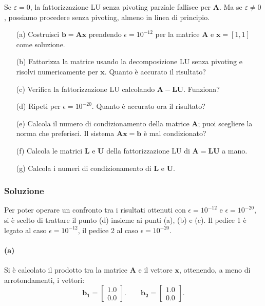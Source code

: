 \documentclass[letterpaper, 12pt]{article}
\numberwithin{equation}{section}    %
\begin{document}
Se $\varepsilon=0$, la fattorizzazione LU senza pivoting parziale fallisce per $\mathbf{A}$. Ma se 
$\varepsilon\neq 0$, 
possiamo procedere senza pivoting, almeno in linea di principio. \\
\begin{enumerate}[label=(\alph*)]
    \item[(a)] Costruisci $\mathbf{b}=\mathbf{Ax}$ prendendo $\epsilon=10^{-12}$ per la matrice $\mathbf{A}$ e 
    $\mathbf{x}=[1,1]$ come soluzione.
    \item[(b)] Fattorizza la matrice usando la decomposizione LU senza pivoting e risolvi numericamente per $\mathbf{x}$. 
    Quanto è accurato il risultato?
    \item[(c)] Verifica la fattorizzazione LU calcolando $\mathbf{A}-\mathbf{LU}$. Funziona?
    \item[(d)] Ripeti per $\epsilon=10^{-20}$. Quanto è accurato ora il risultato?
    \item[(e)] Calcola il numero di condizionamento della matrice $\mathbf{A}$; puoi scegliere la norma che preferisci. 
    Il sistema $\mathbf{Ax}=\mathbf{b}$ è mal condizionato?
    \item[(f)] Calcola le matrici $\mathbf{L}$ e $\mathbf{U}$ della fattorizzazione LU di $\mathbf{A}=\mathbf{LU}$ a mano.
    \item[(g)] Calcola i numeri di condizionamento di $\mathbf{L}$ e $\mathbf{U}$.
\end{enumerate}

\subsubsection{Soluzione}
Per poter operare un confronto tra i risultati ottenuti con $\epsilon = 10^{-12}$ e $\epsilon = 10^{-20}$, si è
scelto di trattare il punto (d) insieme ai punti (a), (b) e (c). Il pedice 1 è legato al caso $\epsilon = 10^{-12}$,
il pedice 2 al caso $\epsilon = 10^{-20}$. 
\paragraph{(a)}Si è calcolato il prodotto tra la matrice $\mathbf{A}$ e il vettore $\mathbf{x}$, ottenendo, 
a meno di arrotondamenti, i vettori:
\begin{equation*}
    \mathbf{b_1} = \begin{bmatrix}
         1.0 \\
         0.0
    \end{bmatrix}.
\qquad
    \mathbf{b_2} = \begin{bmatrix}
         1.0\\
         0.0
    \end{bmatrix}.
\end{equation*}
\end{document}
